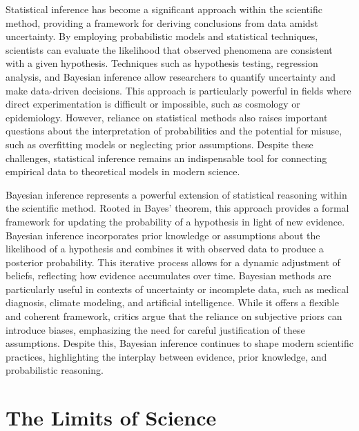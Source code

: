 Statistical inference has become a significant approach within the scientific method, providing a framework for deriving conclusions from data amidst uncertainty. By employing probabilistic models and statistical techniques, scientists can evaluate the likelihood that observed phenomena are consistent with a given hypothesis. Techniques such as hypothesis testing, regression analysis, and Bayesian inference allow researchers to quantify uncertainty and make data-driven decisions. This approach is particularly powerful in fields where direct experimentation is difficult or impossible, such as cosmology or epidemiology. However, reliance on statistical methods also raises important questions about the interpretation of probabilities and the potential for misuse, such as overfitting models or neglecting prior assumptions. Despite these challenges, statistical inference remains an indispensable tool for connecting empirical data to theoretical models in modern science.

Bayesian inference represents a powerful extension of statistical reasoning within the scientific method. Rooted in Bayes' theorem, this approach provides a formal framework for updating the probability of a hypothesis in light of new evidence. Bayesian inference incorporates prior knowledge or assumptions about the likelihood of a hypothesis and combines it with observed data to produce a posterior probability. This iterative process allows for a dynamic adjustment of beliefs, reflecting how evidence accumulates over time. Bayesian methods are particularly useful in contexts of uncertainty or incomplete data, such as medical diagnosis, climate modeling, and artificial intelligence. While it offers a flexible and coherent framework, critics argue that the reliance on subjective priors can introduce biases, emphasizing the need for careful justification of these assumptions. Despite this, Bayesian inference continues to shape modern scientific practices, highlighting the interplay between evidence, prior knowledge, and probabilistic reasoning.


%
% 

\section{The Limits of Science}

